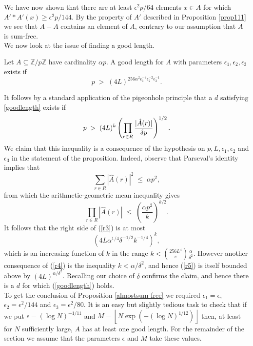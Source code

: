 \documentclass[a4paper,12pt]{article}
\begin{document}
We have now shown that there are at least $\epsilon^2 p/64$ elements $x \in A$ for which $A' \ast A'(x) \geq \epsilon^2 p/144$. By the property of $A'$ described in Proposition \ref{prop111} we see that $A + A$ contains an element of $A$, contrary to our assumption that $A$ is sum-free.\endproof\\[11pt]
We now look at the issue of finding a good length. 
\begin{propositionenv} Let $A \subseteq \mathbb{Z}/p\mathbb{Z}$ have cardinality $\alpha p$.
A good length for $A$ with parameters $\epsilon_1,\epsilon_2,\epsilon_3$ exists if \begin{equation}\label{smiley} p\; >\;
    ( 4L)^{256\alpha^{2 }\epsilon_1^{-4}\epsilon_2^{-2}\epsilon_{3}^{-1} }.\end{equation}
\end{propositionenv}
\proof It follows by a standard application of the pigeonhole principle that 
a $d$ satisfying \eqref{goodlength} exists if
    \begin{equation}\label{r3}
     p \; > \; (4L)^k\left(\prod_{r\in R} { |\hat{A}(r) |\over\delta p}\right )^{1/2} .
    \end{equation}
We claim that this inequality is a consequence of the hypothesis on $p,L,\epsilon_1,\epsilon_2$ and $\epsilon_3$ in the statement of the proposition.
Indeed, observe that Parseval's identity implies that
    \begin{equation} \label{r4}
    \sum  _{r \in R}  |\hat{A}(r) |^2 \; \le  \; \alpha  p^2,
    \end{equation}
from which the arithmetic-geometric mean inequality gives
     \[ \prod _{r \in R}  |\hat{A}(r) | \; \le  \; \left(\frac{\alpha
p^2}{k}\right )^{k/2}.\]
     It follows that the right side of (\ref{r3}) is at most
    \begin{equation}\label{r5}(4L\alpha^{1/4}\delta^{-1/2} k^{-1/4} )^k,\end{equation}
which is an increasing function of $k$ in the range $k < \left(\frac{256L^4}{e}\right)\frac{\alpha}{\delta^2}$. However another consequence of (\ref{r4}) is the inequality $k < \alpha/\delta^2$, and hence (\ref{r5}) is itself bounded above by 
$(4L)^{\alpha /\delta^2}$. Recalling our choice of $\delta$ confirms the claim, and hence there is a $d$ for which (\ref{goodlength}) holds. \endproof\\[11pt]
To get the conclusion of Proposition \ref{almostsum-free} we required $\epsilon_1 = \epsilon$, $\epsilon_2 = \epsilon^2/144$ and $\epsilon_3 = \epsilon^2/80$. It is an easy but slightly tedious task to check that if we put $\epsilon = (\log N)^{-1/11}$ and $M = \left\lfloor N\exp(-(\log N)^{1/12})\right\rfloor$ then, at least for $N$ sufficiently large, $A$ has at least one good length. For the remainder of the section we assume that the parameters $\epsilon$ and $M$ take these values.\\[11pt]
\end{document}

